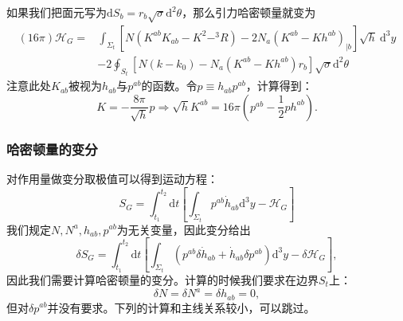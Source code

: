 \documentclass[hyperref, UTF8, a4paper]{ctexart}
\begin{document}
如果我们把面元写为$\mathrm{d} S_{b} =r_{b}\sqrt{\sigma }\mathrm{d}^{2} \theta $，那么引力哈密顿量就变为
\begin{equation*}
	\boxed{\begin{aligned}
			(16\pi )\mathcal{H}_{G} = & \int _{\Sigma _{t}}\left[ N\left( K^{ab} K_{ab} -K^{2} -^{3} R\right) -2N_{a} (K^{ab} -Kh^{ab} )_{\mid b}\right]\sqrt{h} \ \mathrm{d}^{3} y\\
			& -2\oint _{S_{t}}\left[ N( k-k_{0}) -N_{a}\left( K^{ab} -Kh^{ab}\right) r_{b}\right]\sqrt{\sigma }\mathrm{d}^{2} \theta 
	\end{aligned}}
\end{equation*}
注意此处$K_{ab}$被视为$h_{ab}$与$p^{ab}$的函数。令$p\equiv h_{ab} p^{ab}$，计算得到：
\begin{equation*}
	K=-\frac{8\pi }{\sqrt{h}} p\Rightarrow \sqrt{h} K^{ab} =16\pi \left( p^{ab} -\frac{1}{2} ph^{ab}\right) .
\end{equation*}

\subsubsection{哈密顿量的变分}

对作用量做变分取极值可以得到运动方程：
\begin{equation*}
	S_{G} =\int _{t_{1}}^{t_{2}}\mathrm{d} t\left[\int _{\Sigma _{t}} p^{ab}\dot{h}_{ab}\mathrm{d}^{3} y-\mathcal{H}_{G}\right]
\end{equation*}
我们规定$N,N^{a} ,h_{ab} ,p^{ab}$为无关变量，因此变分给出
\begin{equation*}
	\delta S_{G} =\int _{t_{1}}^{t_{2}}\mathrm{d} t\left[\int _{\Sigma _{t}} (p^{ab} \delta \dot{h}_{ab} +\dot{h}_{ab} \delta p^{ab} )\mathrm{d}^{3} y-\delta \mathcal{H}_{G}\right] ,
\end{equation*}
因此我们需要计算哈密顿量的变分。计算的时候我们要求在边界$S_{t}$上：
\begin{equation*}
	\delta N=\delta N^{a} =\delta h_{ab} =0,
\end{equation*}
但对$\delta p^{ab}$并没有要求。下列的计算和主线关系较小，可以跳过。
\end{document}
